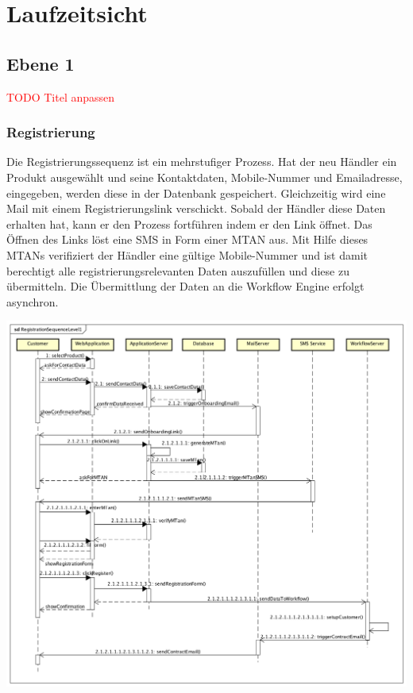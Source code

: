 \graphicspath{{./images/}}

\chapter{Laufzeitsicht}

\section{Ebene 1} \textcolor{red}{TODO Titel anpassen}

\subsection{Registrierung}

Die Registrierungssequenz ist ein mehrstufiger Prozess. Hat der neu Händler ein Produkt ausgewählt und seine Kontaktdaten, Mobile-Nummer und Emailadresse, eingegeben, werden diese in der Datenbank gespeichert. Gleichzeitig wird eine Mail mit einem Registrierungslink verschickt. Sobald der Händler diese Daten erhalten hat, kann er den Prozess fortführen indem er den Link öffnet. Das Öffnen des Links löst eine SMS in Form einer MTAN aus. Mit Hilfe dieses MTANs verifiziert der Händler eine gültige Mobile-Nummer und ist damit berechtigt alle registrierungsrelevanten Daten auszufüllen und diese zu übermitteln. Die Übermittlung der Daten an die Workflow Engine erfolgt asynchron.
\begin{center}
	\includegraphics[scale=0.44]{RegistrationSequenceLevel1.png}
\end{center}
\newpage

